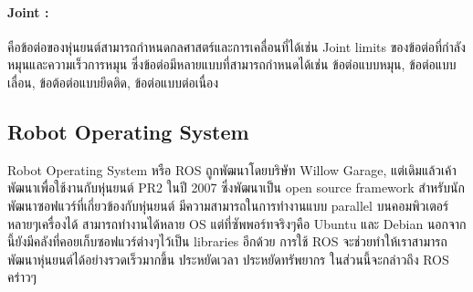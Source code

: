 \paragraph*{Joint :}
คือข้อต่อของหุ่นยนต์สามารถกำหนดกลศาสตร์และการเคลื่อนที่ได้เช่น Joint limits ของข้อต่อที่กำลังหมุนและความเร็วการหมุน ซึ่งข้อต่อมีหลายแบบที่สามารถกำหนดได้เช่น ข้อต่อแบบหมุน, ข้อต่อแบบเลื่อน, ข้อต้อต่อแบบยึดติด, ข้อต่อแบบต่อเนื่อง

\clearpage
\subsection{Robot Operating System}
Robot Operating System หรือ ROS ถูกพัฒนาโดยบริษัท Willow Garage, แต่เดิมแล้วเค้าพัฒนาเพื่อใช้งานกับหุ่นยนต์ PR2 ในปี 2007
ซึ่งพัฒนาเป็น open source framework สำหรับนักพัฒนาซอฟแวร์ที่เกี่ยวข้องกับหุ่นยนต์ มีความสามารถในการทำงานแบบ parallel
บนคอมพิวเตอร์หลายๆเครื่องได้ สามารถทำงานได้หลาย OS แต่ที่ซัพพอร์ทจริงๆคือ Ubuntu และ Debian นอกจากนี้ยังมีคลังที่คอยเก็บซอฟแวร์ต่างๆไว้เป็น
libraries อีกด้วย การใช้ ROS จะช่วยทำให้เราสามารถพัฒนาหุ่นยนต์ได้อย่างรวดเร็วมากขึ้น ประหยัดเวลา ประหยัดทรัพยากร
ในส่วนนี้จะกล่าวถึง ROS คร่าวๆ

